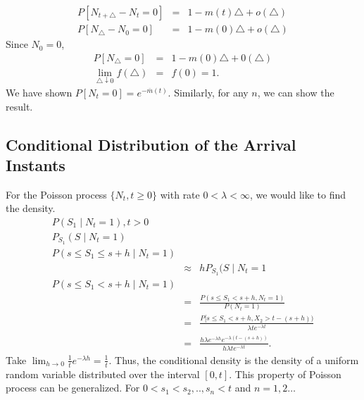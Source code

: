 \documentclass[11 pt]{article}
\theoremstyle{plain}
\theoremstyle{definition}
\theoremstyle{remark}
\begin{document}
  \begin{eqnarray*}
  P[N_{t+\triangle}-N_{t}=0] &=& 1-m(t)\triangle +o(\triangle) \\
  P[N_{\triangle}-N_{0}=0] &=& 1-m(0)\triangle +o(\triangle) 
  \end{eqnarray*}
  Since $ N_{0}=0$, 
  \begin{eqnarray*}
   P[N_{\triangle} =0]&=& 1-m(0)\triangle +0(\triangle) \\
  \lim_{\triangle\downarrow 0}f(\triangle) &=& f(0)=1.
\end{eqnarray*}
We have shown $P[N_{t}=0] = e^{-\overline{m}(t)}$. Similarly, for any $n$, we can show the result.

\subsection{Conditional Distribution of the Arrival Instants}
\noindent For the Poisson process $\{N_{t}, t\geq 0\}$ with rate $0<\lambda< \infty$, we would like to find the density.
\begin{eqnarray*}
  P(S_{1}\mid N_{t}=1), t>0 \\
  P_{S_1}(S \mid N_{t}=1) \\
  P(s\leq S_{1} \leq s+h \mid N_{t}=1)\\
   &\approx& h P_{S_1}(S \mid N_{t}=1 \\
  P(s\leq S_{1}< s+h \mid N_{t}=1)\\
   &=& \frac{P(s\leq S_{1}< s+h,N_{t}=1)}{P(N_{t}=1)}\\
   &=& \frac{P[s\leq S_{1}<s+h,X_{2}>t-(s+h))}{\lambda t e^{-\lambda t}} \\
   &=& \frac{h \lambda e^{-\lambda h} e^{-\lambda (t-(s+h))}}{h{\lambda t} e^{-\lambda t}}.
   \end{eqnarray*}
   Take  $\lim _{h\rightarrow 0}\frac{1}{t}{e^{-\lambda h}} =\frac{1}{t}.$ Thus, the conditional density is the density of a uniform random variable distributed over the interval $[0,t].$ This property of Poisson process can be generalized. For $0<s_{1}<s_{2},.., s_{n}<t$ and $n=1,2 \hdots$ \\
\end{document}
